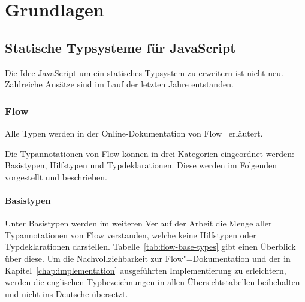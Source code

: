 \chapter{Grundlagen}
\label{chap:basics}

\section{Statische Typsysteme für JavaScript}

Die Idee JavaScript um ein statisches Typsystem zu erweitern ist nicht neu. Zahlreiche Ansätze sind im Lauf der letzten Jahre entstanden.


\subsection{Flow}
\label{subsection:flow}

Alle Typen werden in der Online-Dokumentation von Flow~\autocite{FLOW:TYPE_ANNOTATIONS} erläutert.

Die Typannotationen von Flow können in drei Kategorien eingeordnet werden: Basistypen, Hilfstypen und Typdeklarationen. Diese werden im Folgenden vorgestellt und beschrieben.

\subsubsection{Basistypen}
\label{subsection:flow:base-types}

Unter Basistypen werden im weiteren Verlauf der Arbeit die Menge aller Typannotationen von Flow verstanden, welche keine Hilfstypen oder Typdeklarationen darstellen. Tabelle~\ref{tab:flow-base-types} gibt einen Überblick über diese. Um die Nachvollziehbarkeit zur Flow"=Dokumentation und der in Kapitel~\ref{chap:implementation} ausgeführten Implementierung zu erleichtern, werden die englischen Typbezeichnungen in allen Übersichtstabellen beibehalten und nicht ins Deutsche übersetzt.

